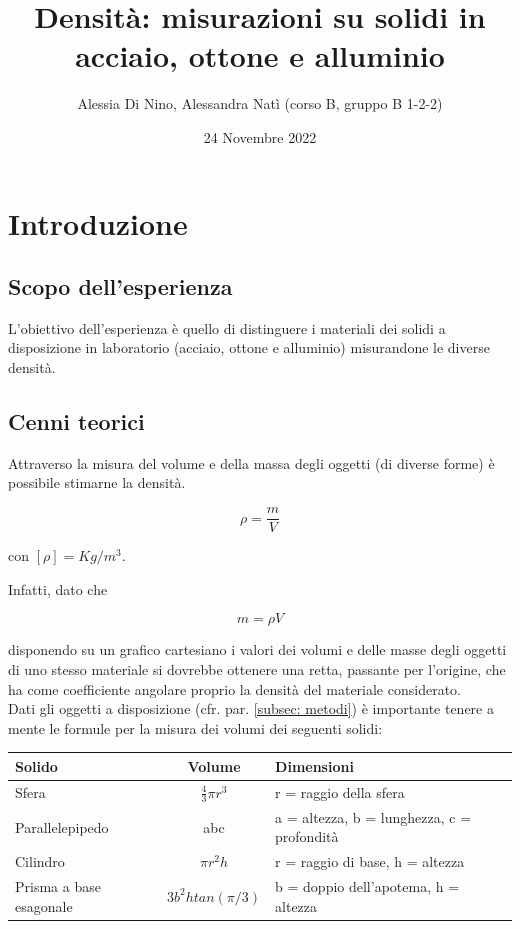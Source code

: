 \documentclass{article}
\begin{document}
\title{Densità: misurazioni su solidi in acciaio, ottone e alluminio}
\author{Alessia Di Nino, Alessandra Natì (corso B, gruppo B 1-2-2)}
\date{24 Novembre 2022}
\maketitle

\section{Introduzione}
\subsection{Scopo dell'esperienza} %
L’obiettivo dell’esperienza è quello di distinguere i materiali dei solidi a disposizione in laboratorio (acciaio, ottone e alluminio) misurandone le diverse densità.  

\subsection{Cenni teorici} %
Attraverso la misura del volume e della massa degli oggetti (di diverse forme) è possibile stimarne la densità. 

\begin{equation}
    \rho = \frac{m}{V}
\end{equation}

con $[\rho] = Kg/m^3$.

Infatti, dato che

\begin{equation}
    m = \rho V
\end{equation}

disponendo su un grafico cartesiano i valori dei volumi e delle masse degli oggetti di uno stesso materiale si dovrebbe ottenere una retta, passante per l'origine, che ha come coefficiente angolare proprio la densità del materiale considerato.\\ 
Dati gli oggetti a disposizione (cfr. par. \ref{subsec: metodi}) è importante tenere a mente le formule per la misura dei volumi dei seguenti solidi:

\begin{tabular}{lcl}
     \toprule
     Solido & Volume & Dimensioni\\
     \midrule
     Sfera & $\frac{4}{3}\pi r^3$ & r = raggio della sfera\\
     Parallelepipedo & abc & a = altezza, b = lunghezza, c = profondità\\
     Cilindro & $\pi r^2h$ & r = raggio di base, h = altezza\\
     Prisma a base esagonale & $3b^2htan(\pi/3)$ & b = doppio dell'apotema, h = altezza\\
     \bottomrule
\end{tabular}
\end{document}
